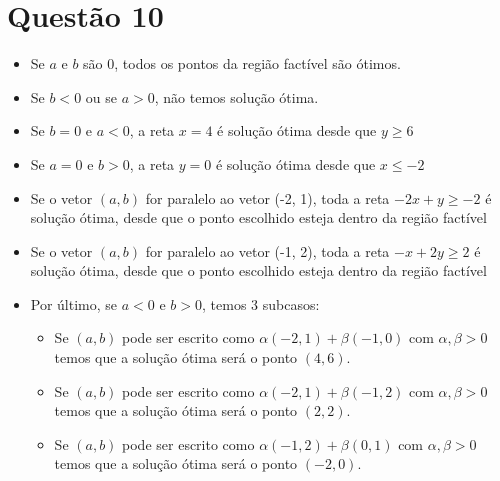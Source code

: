 \documentclass[11pt]{article}
\begin{document}
\section{Questão 10}
\label{sec:org2bb2211}
\begin{itemize}
\item Se \(a\) e \(b\) são 0, todos os pontos da região factível são ótimos.
\item Se \(b < 0\) ou se \(a > 0\), não temos solução ótima.
\item Se \(b = 0\) e \(a < 0\), a reta \(x = 4\) é solução ótima desde que \(y \geq 6\)
\item Se \(a = 0\) e \(b > 0\), a reta \(y = 0\) é solução ótima desde que \(x \leq -2\)
\item Se o vetor \((a, b)\) for paralelo ao vetor (-2, 1), toda a reta \(-2x+y \geq -2\) é solução ótima, desde que o ponto escolhido esteja dentro da região factível
\item Se o vetor \((a, b)\) for paralelo ao vetor (-1, 2), toda a reta \(-x+2y \geq 2\) é solução ótima, desde que o ponto escolhido esteja dentro da região factível
\item Por último, se \(a < 0\) e \(b > 0\), temos 3 subcasos:
\begin{itemize}
\item Se \((a, b)\) pode ser escrito como \(\alpha(-2, 1)+\beta(-1, 0)\) com \(\alpha,\beta>0\) temos que a solução ótima será o ponto \((4, 6)\).
\item Se \((a, b)\) pode ser escrito como \(\alpha(-2, 1)+\beta(-1, 2)\) com \(\alpha,\beta>0\) temos que a solução ótima será o ponto \((2, 2)\).
\item Se \((a, b)\) pode ser escrito como \(\alpha(-1, 2)+\beta(0, 1)\) com \(\alpha,\beta>0\) temos que a solução ótima será o ponto \((-2, 0)\).
\end{itemize}
\end{itemize}
\end{document}
